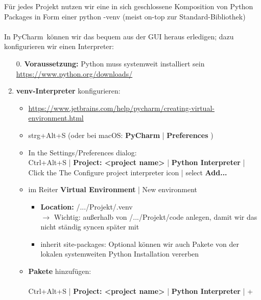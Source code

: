 Für jedes Projekt nutzen wir eine in sich geschlossene Komposition von Python Packages in Form einer python -venv (meist on-top zur Standard-Bibliothek)  \\~\\
In PyCharm~können wir das bequem aus der GUI heraus erledigen; dazu konfigurieren wir einen Interpreter:
\begin{enumerate}
	\item[0.] \textbf{Voraussetzung:} Python muss systemweit installiert sein \url{https://www.python.org/downloads/}
	\item \textbf{venv-Interpreter} konfigurieren:
	      \begin{itemize}
		      \item \url{https://www.jetbrains.com/help/pycharm/creating-virtual-environment.html}
		      \item strg+Alt+S (oder bei macOS:  \textbf{PyCharm} | \textbf{Preferences} )
		      \item In the Settings/Preferences dialog:\\
		            Ctrl+Alt+S | \textbf{Project: <project name>} | \textbf{Python Interpreter} |
		            Click the The Configure project interpreter icon | select \textbf{Add...}
		      \item im Reiter \textbf{Virtual Environment} | New environment
		            \begin{itemize}
			            \item \textbf{Location: }/.../Projekt/.venv\\
			                  $\to$ {\color{red}Wichtig:}  außerhalb von /.../Projekt/code anlegen, damit wir das nicht ständig syncen später mit \git
			            \item inherit site-packages: Optional können wir auch Pakete von der lokalen systemweiten Python Installation vererben
		            \end{itemize}
		      \item  \textbf{Pakete} hinzufügen:\\~\\
		            Ctrl+Alt+S | \textbf{Project: <project name>} | \textbf{Python Interpreter} | +\\~\\

\end{itemize}
\end{enumerate}
